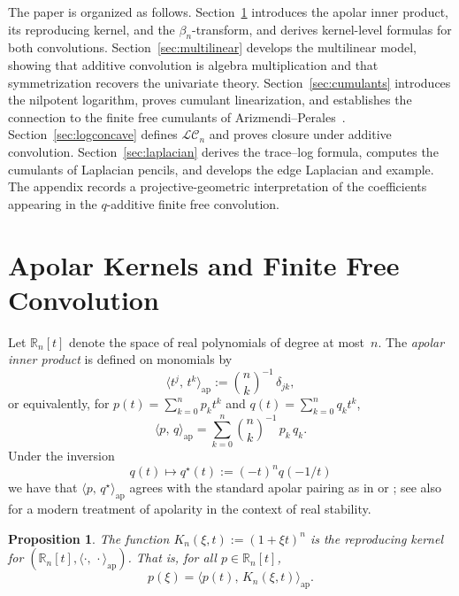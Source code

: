 \documentclass[11pt]{amsart}
\newtheorem{prop}[thm]{Proposition}
\theoremstyle{definition}
\newcommand{\R}{\mathbb{R}}
\newcommand{\ip}[2]{\langle #1,\, #2 \rangle}
\newcommand{\bn}[2]{{\textstyle\binom{#1}{#2}}}
\begin{document}
The paper is organized as follows.
Section~\ref{sec:apolar} introduces the apolar inner product, its reproducing kernel, and the $\beta_n$-transform, and derives kernel-level formulas for both convolutions.
Section~\ref{sec:multilinear} develops the multilinear model, showing that additive convolution is algebra multiplication and that symmetrization recovers the univariate theory.
Section~\ref{sec:cumulants} introduces the nilpotent logarithm, proves cumulant linearization, and establishes the connection to the finite free cumulants of Arizmendi--Perales~\cite{AP18}.
Section~\ref{sec:logconcave} defines $\mathcal{LC}_n$ and proves closure under additive convolution.
Section~\ref{sec:laplacian} derives the trace--log formula, computes the cumulants of Laplacian pencils, and develops the edge Laplacian and example.
The appendix records a projective-geometric interpretation of the coefficients appearing in the $q$-additive finite free convolution.



\section{Apolar Kernels and Finite Free Convolution}
\label{sec:apolar}


Let $\R_n[t]$ denote the space of real polynomials of degree at most~$n$.  The \emph{apolar inner product} is defined on monomials by
\[
  \ip{t^j}{t^k}_{\mathrm{ap}}
  := \bn{n}{k}^{-1}\, \delta_{jk},
\]
or equivalently, for
$p(t) = \sum_{k=0}^n p_k t^k$ and
$q(t) = \sum_{k=0}^n q_k t^k$,
\[
  \ip{p}{q}_{\mathrm{ap}}
  = \sum_{k=0}^n \bn{n}{k}^{-1}\, p_k\, q_k.
\]
Under the inversion
\begin{equation}\label{eq:star-inversion}
    q(t)\mapsto q^\star(t) := (-t)^n q(-1/t)
\end{equation}
we have that $\ip{p}{q^\star}_{\mathrm{ap}}$ agrees with the standard apolar pairing as in \cite[Chapter IV]{Marden} or \cite{Rez92}; see also \cite{Leake} for a modern treatment of apolarity in the context of real stability.

\begin{prop}\label{prop:reproducing-kernel}
The function $K_n(\xi,t) := (1+\xi t)^n$ is the reproducing kernel for $(\R_n[t],\ip{\cdot}{\cdot}_{\mathrm{ap}})$. That is, for all $p\in\R_n[t]$,
\[
  p(\xi) = \ip{p(t)}{K_n(\xi,t)}_{\mathrm{ap}}.
\]
\end{prop}
\end{document}
